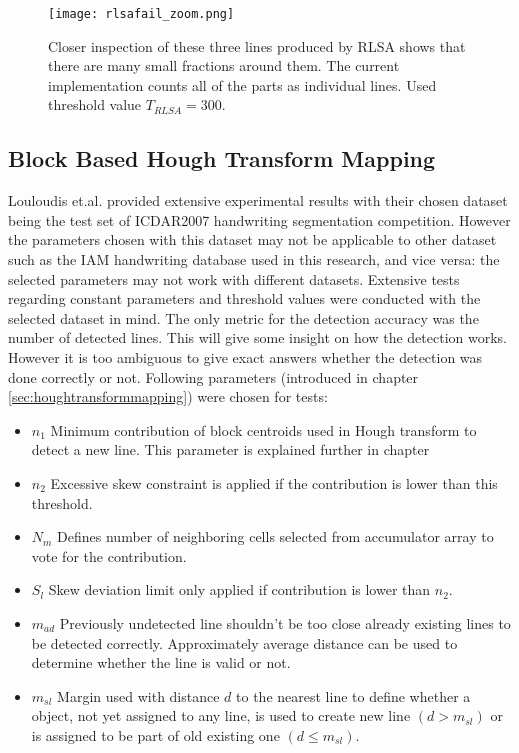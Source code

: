 \documentclass{article}
\begin{document}
      \begin{figure}[!ht]
        \centering
        \texttt{[image: rlsafail\_zoom.png]}
        \caption{Closer inspection of these three lines produced by RLSA shows that there are many small fractions around them. The current implementation counts all of the parts as individual lines. Used threshold value $T_{RLSA} = 300$.  \label{fig:rlsafail}}
      \end{figure}

    \subsection{Block Based Hough Transform Mapping}
      \label{sec:houghtransformevaluation}
      Louloudis et.al. provided extensive experimental results with their chosen dataset being the test set of ICDAR2007 handwriting segmentation competition. However the parameters chosen with this dataset may not be applicable to other dataset such as the IAM handwriting database used in this research, and vice versa: the selected parameters may not work with different datasets. Extensive tests regarding constant parameters and threshold values were conducted with the selected dataset in mind. The only metric for the detection accuracy was the number of detected lines. This will give some insight on how the detection works. However it is too ambiguous to give exact answers whether the detection was done correctly or not. Following parameters (introduced in chapter \ref{sec:houghtransformmapping}) were chosen for tests:

      \begin{itemize}
        \item $n_1$ Minimum contribution of block centroids used in Hough transform to detect a new line. This parameter is explained further in chapter
        \item $n_2$ Excessive skew constraint is applied if the contribution is lower than this threshold.
        \item $N_m$  Defines number of neighboring cells selected from accumulator array to vote for the contribution.
        \item $S_l$ Skew deviation limit only applied if contribution is lower than $n_2$.
        \item $m_{ad}$ Previously undetected line shouldn't be too close already existing lines to be detected correctly. Approximately average distance can be used to determine whether the line is valid or not.
        \item $m_{sl}$ Margin used with distance $d$ to the nearest line to define whether a object, not yet assigned to any line, is used to create new line $(d > m_{sl})$ or is assigned to be part of old existing one $(d \leq m_{sl})$.
      \end{itemize}
\end{document}
